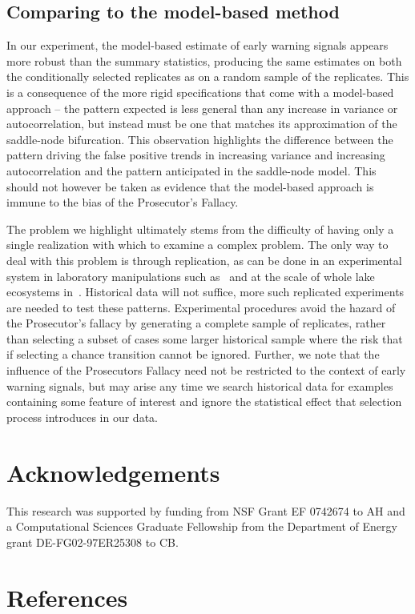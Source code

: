 \documentclass[authoryear,review,12pt]{elsarticle}
\begin{document}
\subsection{Comparing to the model-based method}

In our experiment, the model-based estimate of early warning signals
appears more robust than the summary statistics, producing the same
estimates on both the conditionally selected replicates as on a random
sample of the replicates.  This is a consequence of the more rigid
specifications that come with a model-based approach -- the pattern
expected is less general than any increase in variance or autocorrelation,
but instead must be one that matches its approximation of the saddle-node
bifurcation. This observation highlights the difference between the
pattern driving the false positive trends in increasing variance and
increasing autocorrelation and the pattern anticipated in the saddle-node
model. This should not however be taken as evidence that the model-based
approach is immune to the bias of the Prosecutor's Fallacy.


The problem we highlight ultimately stems from the difficulty of having
only a single realization with which to examine a complex problem.
The only way to deal with this problem is through replication, as
can be done in an experimental system in laboratory manipulations
such as~\citet{Drake2010, Veraart2011} and at the scale of whole lake
ecosystems in~\citet{Carpenter2011}.  Historical data will not suffice,
more such replicated experiments are needed to test these patterns.
Experimental procedures avoid the hazard of the Prosecutor's fallacy by
generating a complete sample of replicates, rather than selecting a subset
of cases some larger historical sample where the risk that if selecting a
chance transition cannot be ignored.  Further, we note that the influence
of the Prosecutors Fallacy need not be restricted to the context of early
warning signals, but may arise any time we search historical data for
examples containing some feature of interest and ignore the statistical
effect that selection process introduces in our data.





 \section{Acknowledgements}
This research was supported by funding from NSF Grant EF 0742674 to AH
and a Computational Sciences Graduate Fellowship from the Department of
Energy grant DE-FG02-97ER25308 to CB.

 \section{References}%
 
 
\end{document}
